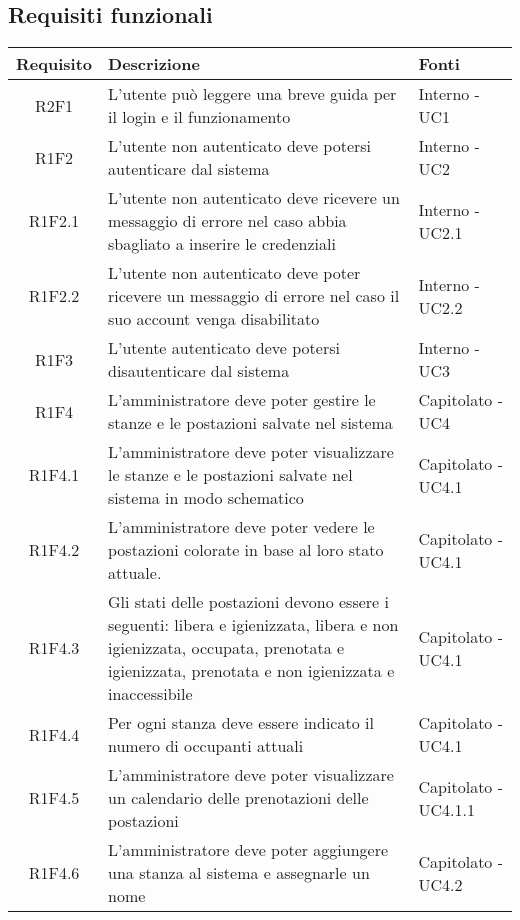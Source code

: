 \subsection{Requisiti funzionali}
\begin{center}
	\begin{longtable}{|c|p{10cm}|p{4cm}|}
		\hline
		\rowcolor{lighter-grayer}
		\textbf{Requisito} & \textbf{Descrizione} & \textbf{Fonti}  \\
		\hline
		\endhead
		
		 R2F1 & L'utente può leggere una breve guida per il login e il funzionamento & Interno - UC1 \\
		\hline
		R1F2	&	L'utente non autenticato deve potersi autenticare dal sistema& Interno - UC2	\\
		\hline
		R1F2.1	&	L'utente non autenticato deve ricevere un messaggio di errore nel caso abbia sbagliato a inserire le credenziali& Interno - UC2.1	\\
		\hline
		R1F2.2	&	L'utente non autenticato deve poter ricevere un messaggio di errore nel caso il suo account venga disabilitato& Interno - UC2.2	\\
		\hline
		R1F3	&	L'utente autenticato deve potersi disautenticare dal sistema& Interno - UC3	\\
		\hline
			R1F4&L'amministratore deve poter gestire le stanze e le postazioni salvate nel sistema	& Capitolato - UC4	\\
					\hline
			R1F4.1&L'amministratore deve poter visualizzare le stanze e le postazioni salvate nel sistema in modo schematico	& Capitolato - UC4.1	\\
					\hline
			R1F4.2&	L'amministratore deve poter vedere le postazioni colorate in base al loro stato attuale.& Capitolato - UC4.1	\\
					\hline
			R1F4.3&	Gli stati delle postazioni devono essere i seguenti: libera e igienizzata, libera e non igienizzata, occupata, prenotata e igienizzata, prenotata e non igienizzata e inaccessibile& 	Capitolato - UC4.1\\
					\hline
			R1F4.4&Per ogni stanza deve essere indicato il numero di occupanti attuali	& Capitolato - UC4.1	\\
					\hline
			R1F4.5&L'amministratore deve poter visualizzare un calendario delle prenotazioni delle postazioni	& Capitolato - UC4.1.1	\\
					\hline
				R1F4.6&L'amministratore deve poter aggiungere una stanza al sistema e assegnarle un nome	& Capitolato - UC4.2	\\

\end{longtable}
\end{center}
